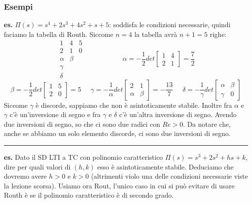 \subsubsection*{Esempi}
\textbf{es.} $\Pi(s) = s^4 + 2s^3 + 4s^2 + s + 5$: soddisfa le condizioni necessarie, quindi faciamo la tabella di Routh. Siccome $n=4$ la tabella avrà $n+1 = 5$ righe:
\[
    \begin{matrix}
        1 & 4 & 5 \\
        2 & 1 & 0 \\
        \alpha & \beta\\
        \gamma\\
        \delta
    \end{matrix} \;\;\;\;\;\;\;\;\;\;\;\;\;\;\;\;\;\;\;\;\alpha = - \frac{1}{2}det\left[\begin{matrix}
        1&4\\2&1
    \end{matrix}\right] = \frac{7}{2}
\]
\[
     \beta = - \frac{1}{2}det\left[\begin{matrix}
        1&5\\2&0
    \end{matrix}\right]=5 \;\;\;\;\; \gamma= -\frac{1}{\alpha} det \left[\begin{matrix}
        2&1\\\alpha&\beta
    \end{matrix}\right] = - \frac{13}{7} \;\;\;\;\; \delta = - \frac{1}{\gamma} det \left[\begin{matrix}
        \alpha & \beta \\ \gamma &0
    \end{matrix}\right]
\]
Siccome $\gamma$ è discorde, sappiamo che non è asintoticamente stabile.\newline
Inoltre fra $\alpha$ e $\gamma$ c'è un'inversione di segno e fra $\gamma$ e $\delta$ c'è un'altra inversione di segno. Avendo due inversioni di segno, so che ci sono due radici con $Re > 0$. Da notare che, anche se abbiamo un solo elemento discorde, ci sono due inversioni di segno.\newline
\rule{\textwidth}{0,4pt}\newline
\newline
\textbf{es.} Dato il SD LTI a TC con polinomio caratteristico $\Pi(s) = s^3 + 2s^2 + hs +k$, dire per quali valori di $(h,k)$ esso è asintoticamente stabile.\newline
Deduciamo che dovremo avere $h>0$ e $k>0$ (altrimenti violo una delle condizioni necessarie viste la lezione scorsa). Usiamo ora Rout, l'unico caso in cui si può evitare di usare Routh è se il polinomio caratteristico è di secondo grado.

